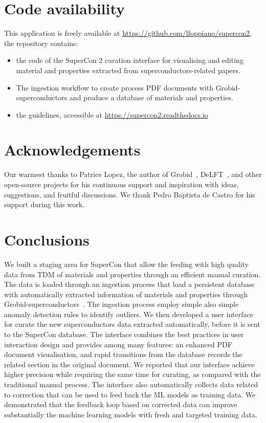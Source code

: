 \documentclass[a4paper]{article}
\begin{document}
\section{Code availability}
This application is freely available at \url{https://github.com/lfoppiano/supercon2}, the repository contains:
\begin{itemize}
\item the code of the SuperCon 2 curation interface for visualising and editing material and properties extracted from superconductors-related papers.
\item The ingestion workflow to create process PDF documents with Grobid-superconductors and produce a database of materials and properties.
\item the guidelines, accessible at \url{https://supercon2.readthedocs.io}
\end{itemize}

\section{Acknowledgements}
Our warmest thanks to Patrice Lopez, the author of Grobid~\cite{GROBID}, DeLFT~\cite{DeLFT}, and other open-source projects for his continuous support and inspiration with ideas, suggestions, and fruitful discussions.
We thank Pedro Baptista de Castro for his support during this work. 

\section{Conclusions}
We built a staging area for SuperCon that allow the feeding with high quality data from TDM of materials and properties through an efficient manual curation. 
The data is loaded through an ingestion process that load a persistent database with automatically extracted information of materials and properties through Grobid-superconductors~\cite{lfoppiano2023automatic}. 
The ingestion process employ simple also simple anomaly detection rules to identify outliers.
We then developed a user interface for curate the new superconductors data extracted automatically, before it is sent to the SuperCon database. 
The interface combines the best practices in user interaction design and provides among many features: an enhanced PDF document visualisation, and rapid transitions from the database records the related section in the original document. 
We reported that our interface achieve higher precision while requiring the same time for curating, as compared with the traditional manual process.
The interface also automatically collects data related to correction that can be used to feed back the ML models as training data. 
We demonstrated that the feedback loop based on corrected data can improve substantially the machine learning models with fresh and targeted training data. 
\end{document}
